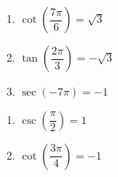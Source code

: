 \begin{multicols}{3}

\begin{enumerate}

\setcounter{enumi}{\value{HW}}

\item $\cot \left( \dfrac{7\pi}{6} \right) = \sqrt{3}$
\item $\tan \left( \dfrac{2\pi}{3} \right) = -\sqrt{3}$
\item $\sec \left( -7\pi \right) = -1$ 

\setcounter{HW}{\value{enumi}}

\end{enumerate}

\end{multicols}

\begin{multicols}{3}

\begin{enumerate}

\setcounter{enumi}{\value{HW}}

\item $\csc \left( \dfrac{\pi}{2} \right) = 1$ 
\item $\cot \left( \dfrac{3\pi}{4} \right) = -1$

\setcounter{HW}{\value{enumi}}

\end{enumerate}

\end{multicols}

